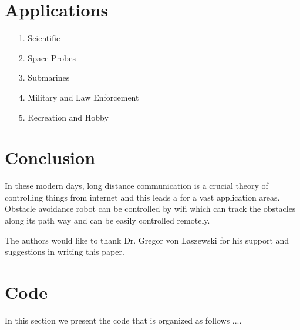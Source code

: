 \documentclass[sigconf]{acmart}
\begin{document}
\section{Applications}
\begin{itemize}
    \item[1.] Scientific
    \item[2.] Space Probes
    \item[3.] Submarines
    \item[4.] Military and Law Enforcement
    \item[5.] Recreation and Hobby
\end{itemize}

\section{Conclusion}
In these modern days, long distance communication is a crucial theory of 
controlling things from internet and this leads a for a vast application 
areas. Obstacle avoidance robot can be controlled by wifi which can track 
the obstacles along its path way and can be easily controlled remotely.

\begin{acks}

The authors would like to thank Dr. Gregor von Laszewski for his support 
and suggestions in writing this paper.

\end{acks}


 

\appendix

\section{Code}

In this section we present the code that is organized as follows ....

\end{document}
